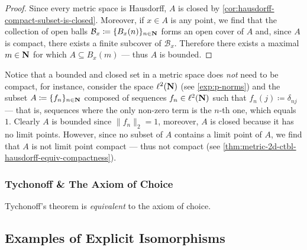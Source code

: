 \begin{proof}
Since every metric space is Hausdorff, \(A\) is closed by
\cref{cor:hausdorff-compact-subset-is-closed}. Moreover, if \(x \in A\) is any
point, we find that the collection of open balls
\(\mathcal{B}_x \coloneq \{B_x(n)\}_{n \in \mathbf{N}}\) forms an open cover of \(A\)
and, since \(A\) is compact, there exists a finite subcover of
\(\mathcal{B}_x\). Therefore there exists a maximal \(m \in \mathbf{N}\) for which
\(A \subseteq B_x(m)\) --- thus \(A\) is bounded.
\end{proof}

\begin{remark}
\label{rem:closed-and-bounded-not-compact}
Notice that a bounded and closed set in a metric space does \emph{not} need to
be compact, for instance, consider the space \(\ell^2(\mathbf{N})\) (see
\cref{exp:p-norms}) and the subset \(A \coloneq \{f_n\}_{n \in \mathbf{N}}\) composed of
sequences \(f_n \in \ell^2(\mathbf{N})\) such that \(f_n(j) \coloneq \delta_{n j}\) ---
that is, sequences where the only non-zero term is the \(n\)-th one, which equals
\(1\). Clearly \(A\) is bounded since \(\| f_{n} \|_2 = 1\), moreover, \(A\) is
closed because it has no limit points. However, since no subset of \(A\)
contains a limit point of \(A\), we find that \(A\) is not limit point compact
--- thus not compact (see \cref{thm:metric-2d-ctbl-hausdorff-equiv-compactness}).
\end{remark}

\subsubsection{Tychonoff \& The Axiom of Choice}

\begin{theorem}
\label{thm:tychonoff-equivalent-choice}
Tychonoff's theorem is \emph{equivalent} to the axiom of choice.
\end{theorem}


\subsection{Examples of Explicit Isomorphisms}

